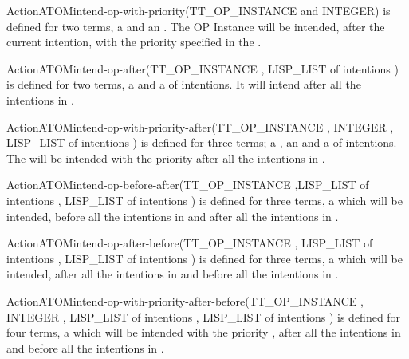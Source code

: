 \begin{typeefa}{Action}{ATOM}{intend-op-with-priority}{(TT\_OP\_INSTANCE and INTEGER)}
is defined for two terms, a  and an . The OP
Instance will be intended, after the current intention, with the priority
specified in the .
\end{typeefa}

\begin{typeefa}{Action}{ATOM}{intend-op-after}{(TT\_OP\_INSTANCE , LISP\_LIST of intentions )}
is defined for two terms, a  and a  of
intentions. It will intend  after all the intentions in
.
\end{typeefa}

\begin{typeefa}{Action}{ATOM}{intend-op-with-priority-after}{(TT\_OP\_INSTANCE , INTEGER , LISP\_LIST of intentions )}
is defined for three terms;  a ,
 an  and  a   of intentions. The
 will be  intended with the priority  after all the
intentions in .
\end{typeefa}

\begin{typeefa}{Action}{ATOM}{intend-op-before-after}{(TT\_OP\_INSTANCE ,LISP\_LIST of intentions , LISP\_LIST of intentions )}
is defined for three terms, a   which will be
intended, before all the intentions in  and after all the
intentions in .
\end{typeefa}

\begin{typeefa}{Action}{ATOM}{intend-op-after-before}{(TT\_OP\_INSTANCE , LISP\_LIST of intentions , LISP\_LIST of intentions )}
is defined for three terms, a   which will be
intended, after all the intentions in  and before all the intentions
in .
\end{typeefa}

\begin{typeefa}{Action}{ATOM}{intend-op-with-priority-after-before}{(TT\_OP\_INSTANCE , INTEGER , LISP\_LIST of intentions , LISP\_LIST of intentions )}
is defined for four terms, a   which will be
intended with the priority , after all the intentions in
 and before all the intentions in .
\end{typeefa}

